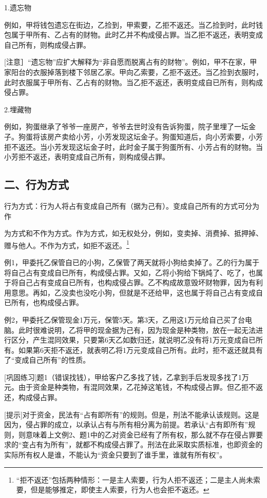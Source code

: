 1.遗忘物

例如，甲将钱包遗忘在街边，乙捡到，甲索要，乙拒不返还。当乙捡到时，此时钱包属于甲所有、乙占有的财物。此时乙并不构成侵占罪。当乙拒不返还，表明变成自己所有，则构成侵占罪。

[注意］“遗忘物”应扩大解释为“非自愿而脱离占有的财物”。例如，甲不在家，甲家阳台的衣服掉落到楼下邻居乙家。甲向乙索要，乙拒不返还。当乙捡到衣服时，此时衣服属于甲所有、乙占有的财物。当乙拒不返还，表明变成自已所有，则构成侵占罪。

2.埋藏物

例如，狗蛋继承了爷爷一座房产，爷爷去世时没有告诉狗蛋，院子里埋了一坛金子。狗蛋将该房产卖给小芳，小芳发现这坛金子。狗蛋知道后，向小芳索要，小芳拒不返还。当小芳发现这坛金子时，此时金子属于狗蛋所有、小芳占有的财物。当小芳拒不返还，表明变成自己所有，则构成侵占罪。

\subsection*{二、行为方式}

行为方式：行为人将占有变成自己所有（据为己有）。变成自己所有的方式可分为作

为方式和不作为方式。作为方式，如无权处分，例如，变卖掉、消费掉、抵押掉、赠与他人。不作为方式，如拒不返还。\footnote{“拒不返还”包括两种情形：一是主人索要，行为人拒不返还；二是主人尚未索要，但是能够推定，即使主人索要，行为人也会拒不返还。}

例1，甲委托乙保管自已的小狗，乙保管了两天就将小狗给卖掉了。乙的行为属于将自己占有变成自已所有，构成侵占罪。又如，乙将小狗给下锅炖了、吃了，也属于将自己占有变成自已所有，也构成侵占罪。乙不构成故意毁坏财物罪，因为有利用意思。再如，乙没卖也没吃小狗，但就是不还给甲，这也属于将自己占有变成自已所有，也构成侵占罪。

例2，甲委托乙保管现金1万元，保管5天。第3天，乙用这1万元给自己买了台电脑。此时很难说明，乙将甲的现金据为己有，因为现金是种类物，放在一起无法进行区分，产生混同效果，只要第6天乙如数归还，就说明乙没有将1万元变成自已所有。如果第6天拒不返还，就表明乙将1万元变成自己所有。此时，拒不返还就具有了“变成自己所有”的性质。

[巩固练习]题1（错误找钱），甲给客户乙多找了钱，乙拿到手后发现多找了1万元。由于资金是种类物，有混同效果，乙花掉这笔钱，不构成侵占罪。但乙拒不返还，构成侵占罪。

[提示]对于资金，民法有“占有即所有”的规则。但是，刑法不能承认该规则。这是因为，侵占罪的成立，以承认占有与所有相分离为前提。若承认“占有即所有”规则，则意味着上文例2、题1中的乙对资金已经有了所有权，那么就不存在侵占罪要求的“变占有为所有”，就都不构成侵占罪了。刑法在此采取实质标准，也即资金的实际所有权人是谁，不能认为“资金只要到了谁手里，谁就有所有权”。

